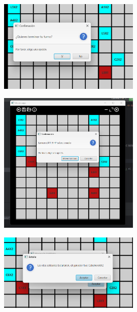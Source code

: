 \documentclass{article}
\begin{document}
	\begin{figure}[H]
		\centering
	\includegraphics[width=0.6\textwidth,keepaspectratio]{img/turno.png}
	\end{figure}
	
	\begin{figure}[H]
		\centering
	\includegraphics[width=0.6\textwidth,keepaspectratio]{img/infoSoldados.png}
	\end{figure}
	\begin{figure}[H]
		\centering
	\includegraphics[width=0.6\textwidth,keepaspectratio]{img/batalla.png}
	\end{figure}
\end{document}
